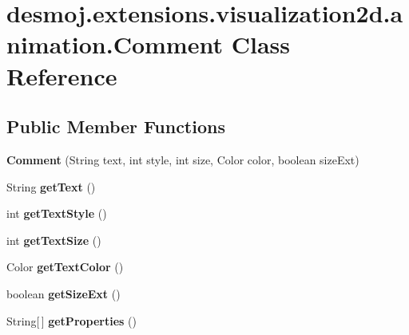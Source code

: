 \section{desmoj.\-extensions.\-visualization2d.\-animation.\-Comment Class Reference}
\label{classdesmoj_1_1extensions_1_1visualization2d_1_1animation_1_1_comment}
\subsection*{Public Member Functions}
\begin{DoxyCompactItemize}
\item 
{\bf Comment} (String text, int style, int size, Color color, boolean size\-Ext)
\item 
String {\bfseries get\-Text} ()\label{classdesmoj_1_1extensions_1_1visualization2d_1_1animation_1_1_comment_ae548555dce8e92ed78dcf5e7a4a99611}

\item 
int {\bfseries get\-Text\-Style} ()\label{classdesmoj_1_1extensions_1_1visualization2d_1_1animation_1_1_comment_a23000bbf01ab3183bb9c4fbdf861d049}

\item 
int {\bfseries get\-Text\-Size} ()\label{classdesmoj_1_1extensions_1_1visualization2d_1_1animation_1_1_comment_af2532fb58b8b741e7a953b7c09434974}

\item 
Color {\bfseries get\-Text\-Color} ()\label{classdesmoj_1_1extensions_1_1visualization2d_1_1animation_1_1_comment_a5a64801a8f7fd66b72d9a61b02da52b6}

\item 
boolean {\bfseries get\-Size\-Ext} ()\label{classdesmoj_1_1extensions_1_1visualization2d_1_1animation_1_1_comment_a6b29a2e4a14932b05d0896635d26d4bc}

\item 
String[$\,$] {\bfseries get\-Properties} ()\label{classdesmoj_1_1extensions_1_1visualization2d_1_1animation_1_1_comment_a7cd934c990ff1de13792eedae880350f}

\end{DoxyCompactItemize}
